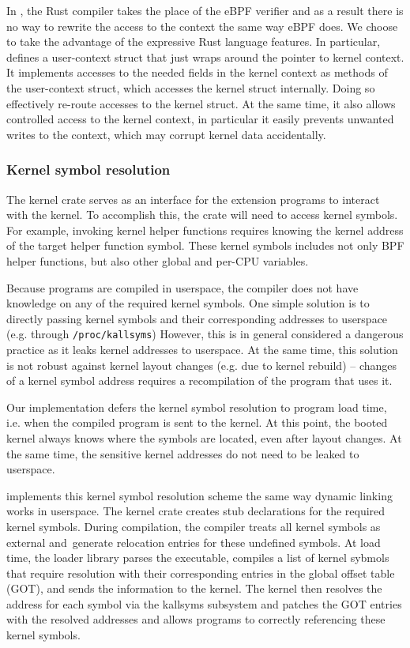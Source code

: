 In \projname{}, the Rust compiler takes the place of the eBPF verifier and as
    a result there is no way to rewrite the access to the context the same
    way eBPF does.
We choose to take the advantage of the expressive Rust language features.
In particular, \projname{} defines a user-context struct that just wraps around
    the pointer to kernel context.
It implements accesses to the needed fields in the kernel context as methods of
    the user-context struct, which accesses the kernel struct internally.
Doing so effectively re-route accesses to the kernel struct.
At the same time, it also allows controlled access to the kernel context, in
    particular it easily prevents unwanted writes to the context, which may
    corrupt kernel data accidentally.

\subsubsection{Kernel symbol resolution}
\label{impl:crate:symbol-resolv}
The \projname{} kernel crate serves as an interface for the extension programs
    to interact with the kernel.
To accomplish this, the crate will need to access kernel symbols.
For example, invoking kernel helper functions requires knowing the kernel
    address of the target helper function symbol.
These kernel symbols includes not only BPF helper functions, but also other
    global and per-CPU variables.

Because \projname{} programs are compiled in userspace, the compiler does not
    have knowledge on any of the required kernel symbols.
One simple solution is to directly passing kernel symbols and their
    corresponding addresses to userspace (e.g. through \texttt{/proc/kallsyms})
However, this is in general considered a dangerous practice as it leaks kernel
    addresses to userspace.
At the same time, this solution is not robust against kernel layout changes
    (e.g. due to kernel rebuild) -- changes of a kernel symbol address requires
    a recompilation of the \projname{} program that uses it.

Our implementation defers the kernel symbol resolution to program load time,
    i.e. when the compiled \projname{} program is sent to the kernel.
At this point, the booted kernel always knows where the symbols are located,
    even after layout changes.
At the same time, the sensitive kernel addresses do not need to be leaked to
    userspace.

\projname{} implements this kernel symbol resolution scheme the same way
    dynamic linking works in userspace.
The \projname{} kernel crate creates stub declarations for the required kernel
    symbols.
During compilation, the compiler treats all kernel symbols as external and\
    generate relocation entries for these undefined symbols.
At load time, the loader library parses the executable, compiles a list of
    kernel sybmols that require resolution with their corresponding entries in
    the global offset table (GOT), and sends the information to the kernel.
The kernel then resolves the address for each symbol via the kallsyms subsystem
    and patches the GOT entries with the resolved addresses and allows programs
    to correctly referencing these kernel symbols.

